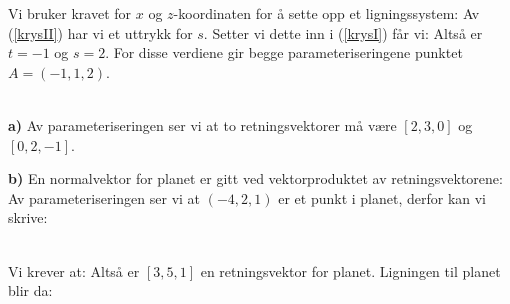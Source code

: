 

\usepackage{xr}


 

Vi bruker kravet for $ x $ og $ z $-koordinaten for å sette opp et ligningssystem:
Av (\ref{krysII}) har vi et uttrykk for $ s $. Setter vi dette inn i (\ref{krysI}) får vi:
Altså er $ t=-1 $ og $ s=2 $. For disse verdiene gir begge parameteriseringene punktet $ A=(-1, 1, 2) $.

 

 

 

\\
\textbf{a)} Av parameteriseringen ser vi at to retningsvektorer må være $ [2, 3, 0] $ og $ [0, 2, -1] $. 

\textbf{b)} En normalvektor for planet er gitt ved vektorproduktet av retningsvektorene:
Av parameteriseringen ser vi at $ (-4, 2, 1) $ er et punkt i planet, derfor kan vi skrive:

 \\
Vi krever at:\vs
{}
Altså er $ [3, 5, 1] $ en retningsvektor for planet. Ligningen til planet blir da:

